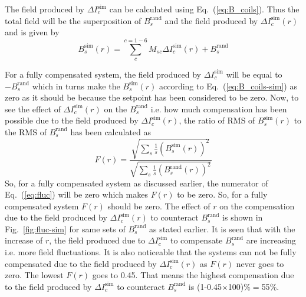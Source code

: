 \FloatBarrier
The field produced by $ \Delta I_c^{\text{sim}}$ can be calculated using Eq.~(\ref{eq:B_coils}). Thus the total field will be the superposition of $B_s^{\text{rand}}$ and the field produced by $ \Delta I_c^{\text{sim}}(r)$ and is given by
\begin{equation}\label{eq:B_coils-sim}
    B_s^{\text{sim}}(r) =\sum_c^{c=1-6} M_{sc} \Delta I_c^{\text{sim}}(r) + B_s^{\text{rand}}
\end{equation}

For a fully compensated system, the field produced by $ \Delta I_c^{\text{sim}}$ will be equal to $- B_s^{\text{rand}}$ which in turns make the $B_s^{\text{sim}}(r)$ according to Eq.~(\ref{eq:B_coils-sim}) as zero as it should be because the setpoint has been considered to be zero. Now, to see the effect of $ \Delta I_c^{\text{sim}}(r)$ on the $B_s^{\text{rand}}$ i.e. how much compensation has been possible due to the field produced by $ \Delta I_c^{\text{sim}}(r)$,  the ratio of RMS of $B_s^{\text{sim}}(r)$ to the RMS of $B_s^{\text{rand}}$ has been calculated as
\begin{equation}\label{eq:fluc}
    F(r)=\frac{\sqrt{\sum_s \frac{1}{s}(B_s^{\text{sim}}(r))^2}}{\sqrt{\sum_s \frac{1}{s}(B_s^{\text{rand}}(r))^2}}
\end{equation}
So, for a fully compensated system as discussed earlier, the numerator of Eq.~(\ref{eq:fluc}) will be zero which makes $F(r)$ to be zero. So, for a fully compensated system $F(r)$ should be zero. The effect of $r$ on the compensation due to the field produced by $ \Delta I_c^{\text{sim}}(r)$ to counteract $B_s^{\text{rand}}$ is shown in Fig.~\ref{fig:fluc-sim} for same sets of $B_s^{\text{rand}}$ as stated earlier. It is seen that with the increase of $r$, the field produced due to $\Delta I_c^{\text{sim}}$ to compensate $B_s^{\text{rand}}$  are increasing i.e. more field fluctuations. It is also noticeable that the systems can not be fully compensated due to the field produced by $ \Delta I_c^{\text{sim}}(r)$ as $F(r)$ never goes to zero. The lowest $F(r)$ goes to 0.45. That means the highest compensation due to the field produced by  $\Delta I_c^{\text{sim}}$ to counteract $B_s^{\text{rand}}$ is (1-0.45$\times$100)$\%=$55$\%$.


